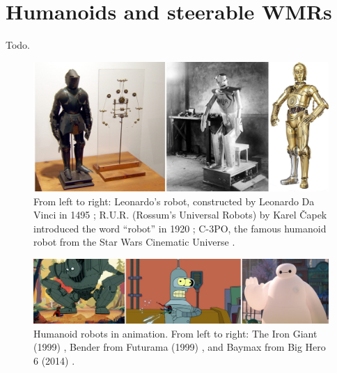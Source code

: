 \chapter{Humanoids and steerable WMRs}
\label{ch:humanoids-and-swmrs}
Todo. 

\begin{figure}
    \centering
    \includegraphics[width=\textwidth]{figures/01-introduction/robot-history.jpg}
    \caption{From left to right: Leonardo's robot, constructed by Leonardo Da
        Vinci in 1495 \cite{Moran2006TheDaVinciRobot};
        R.U.R. (Rossum's Universal Robots) by Karel {\v C}apek introduced 
        the word ``robot'' in 1920 \cite{Capek1920RUR};
        C-3PO, the famous humanoid robot from the Star Wars Cinematic Universe
        \cite{StarWars1977}.
    }
    \label{fig:introduction:robots-in-history}
\end{figure}

\begin{figure}
    \centering
    \includegraphics[width=\textwidth]{figures/01-introduction/robots-in-animation.jpg}
    \caption{Humanoid robots in animation. From left to right:
        The Iron Giant (1999) \cite{TheIronGiant1999},
        Bender from Futurama (1999) \cite{Futurama1999}, and
        Baymax from Big Hero 6 (2014) \cite{BigHero62014}.
    }
    \label{fig:introduction:robots-in-animation}
\end{figure}

